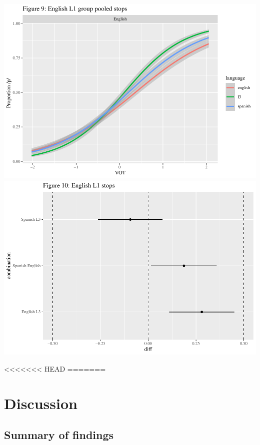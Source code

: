 \documentclass[
  english,
  man]{apa6}
\begin{document}
\includegraphics{master_files/figure-latex/unnamed-chunk-10-1.pdf} \includegraphics{master_files/figure-latex/unnamed-chunk-10-2.pdf}

<<<<<<< HEAD
=======
\hypertarget{discussion}{%
\section{Discussion}\label{discussion}}

\hypertarget{summary-of-findings}{%
\subsection{Summary of findings}\label{summary-of-findings}}
\end{document}
